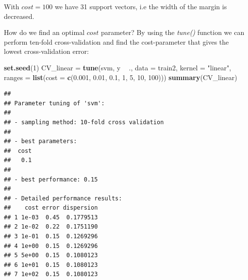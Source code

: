 \documentclass[ignorenonframetext,]{beamer}
\newenvironment{Shaded}{\begin{snugshade}}{\end{snugshade}}
\newcommand{\KeywordTok}[1]{\textcolor[rgb]{0.13,0.29,0.53}{\textbf{#1}}}
\newcommand{\DataTypeTok}[1]{\textcolor[rgb]{0.13,0.29,0.53}{#1}}
\newcommand{\DecValTok}[1]{\textcolor[rgb]{0.00,0.00,0.81}{#1}}
\newcommand{\FloatTok}[1]{\textcolor[rgb]{0.00,0.00,0.81}{#1}}
\newcommand{\StringTok}[1]{\textcolor[rgb]{0.31,0.60,0.02}{#1}}
\newcommand{\OperatorTok}[1]{\textcolor[rgb]{0.81,0.36,0.00}{\textbf{#1}}}
\newcommand{\NormalTok}[1]{#1}
\begin{document}
\begin{frame}[fragile]

With \(cost=100\) we have 31 support vectors, i.e the width of the
margin is decreased.

How do we find an optimal \(cost\) parameter? By using the \emph{tune()}
function we can perform ten-fold cross-validation and find the
cost-parameter that gives the lowest cross-validation error:

\footnotesize

\begin{Shaded}
\begin{Highlighting}[]
\KeywordTok{set.seed}\NormalTok{(}\DecValTok{1}\NormalTok{)}
\NormalTok{CV_linear =}\StringTok{ }\KeywordTok{tune}\NormalTok{(svm, y }\OperatorTok{~}\StringTok{ }\NormalTok{., }\DataTypeTok{data =}\NormalTok{ train2, }\DataTypeTok{kernel =} \StringTok{"linear"}\NormalTok{, }\DataTypeTok{ranges =} \KeywordTok{list}\NormalTok{(}\DataTypeTok{cost =} \KeywordTok{c}\NormalTok{(}\FloatTok{0.001}\NormalTok{, }
    \FloatTok{0.01}\NormalTok{, }\FloatTok{0.1}\NormalTok{, }\DecValTok{1}\NormalTok{, }\DecValTok{5}\NormalTok{, }\DecValTok{10}\NormalTok{, }\DecValTok{100}\NormalTok{)))}
\KeywordTok{summary}\NormalTok{(CV_linear)}
\end{Highlighting}
\end{Shaded}

\begin{verbatim}
## 
## Parameter tuning of 'svm':
## 
## - sampling method: 10-fold cross validation 
## 
## - best parameters:
##  cost
##   0.1
## 
## - best performance: 0.15 
## 
## - Detailed performance results:
##    cost error dispersion
## 1 1e-03  0.45  0.1779513
## 2 1e-02  0.22  0.1751190
## 3 1e-01  0.15  0.1269296
## 4 1e+00  0.15  0.1269296
## 5 5e+00  0.15  0.1080123
## 6 1e+01  0.15  0.1080123
## 7 1e+02  0.15  0.1080123
\end{verbatim}

\normalsize

\end{frame}
\end{document}
